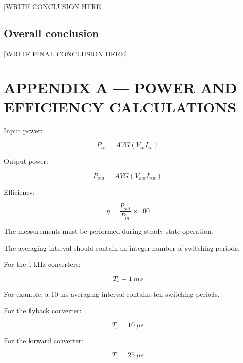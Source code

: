 \documentclass[
  paper=a4,
  oneside  ,captions=tableheading
]{scrartcl}
\begin{document}
{[}WRITE CONCLUSION HERE{]}

\subsection{Overall conclusion}\label{overall-conclusion}

{[}WRITE FINAL CONCLUSION HERE{]}

\section{APPENDIX A --- POWER AND EFFICIENCY
CALCULATIONS}\label{appendix-a-power-and-efficiency-calculations}

Input power:

\[
P_{in}=AVG(V_{in}I_{in})
\]

Output power:

\[
P_{out}=AVG(V_{out}I_{out})
\]

Efficiency:

\[
\eta=
\frac{P_{out}}{P_{in}}\times100
\]

The measurements must be performed during steady-state operation.

The averaging interval should contain an integer number of switching
periods.

For the 1 kHz converters:

\[
T_s=1\ ms
\]

For example, a 10 ms averaging interval contains ten switching periods.

For the flyback converter:

\[
T_s=10\ \mu s
\]

For the forward converter:

\[
T_s=25\ \mu s
\]
\end{document}
